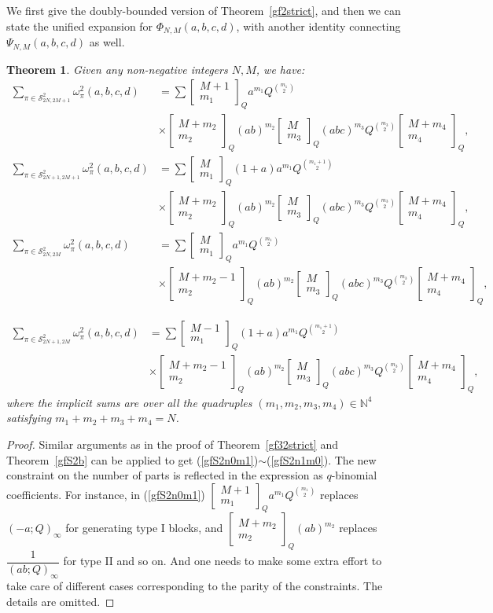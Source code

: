 \documentclass[12pt]{amsart}
\numberwithin{equation}{section}
\theoremstyle{plain}
\newtheorem{theorem}{Theorem}[section]
\theoremstyle{definition}
\newcommand{\N}{\mathbb{N}}
\newcommand\qbin[3]{\left[\begin{matrix} #1 \\ #2 \end{matrix} \right]_{#3}}
\begin{document}
We first give the doubly-bounded version of Theorem~\ref{gf2strict}, and then we can state the unified expansion for $\Phi_{N,M}(a,b,c,d)$, with another identity connecting $\Psi_{N,M}(a,b,c,d)$ as well.
\begin{theorem}\label{bound-s2}
Given any non-negative integers $N,M$, we have:
\begin{align}
\label{gfS2n0m1}
\sum_{\pi\in\mathcal{S}^2_{2N,2M+1}}\omega^2_{\pi}(a,b,c,d) &= \sum\qbin{M+1}{m_1}{Q}a^{m_1}Q^{\binom{m_1}{2}}\\
\nonumber &\times\qbin{M+m_2}{m_2}{Q}(ab)^{m_2} \qbin{M}{m_3}{Q}(abc)^{m_3}Q^{\binom{m_3}{2}}\qbin{M+m_4}{m_4}{Q},\\
\label{gfS2n1m1}
\sum_{\pi\in\mathcal{S}^2_{2N+1,2M+1}}\omega^2_{\pi}(a,b,c,d) &= \sum
\qbin{M}{m_1}{Q}(1+a)a^{m_1}Q^{\binom{m_1+1}{2}}\\
\nonumber &\times\qbin{M+m_2}{m_2}{Q}(ab)^{m_2} \qbin{M}{m_3}{Q}(abc)^{m_3}Q^{\binom{m_3}{2}}\qbin{M+m_4}{m_4}{Q},\\
\label{gfS2n0m0} 
\sum_{\pi\in\mathcal{S}^2_{2N,2M}}\omega^2_{\pi}(a,b,c,d) &= \sum\qbin{M}{m_1}{Q}a^{m_1}Q^{\binom{m_1}{2}}\\
\nonumber &\times\qbin{M+m_2-1}{m_2}{Q}(ab)^{m_2}\qbin{M}{m_3}{Q}(abc)^{m_3}Q^{\binom{m_3}{2}}\qbin{M+m_4}{m_4}{Q},
\end{align}

\begin{align}
\label{gfS2n1m0} 
\sum_{\pi\in\mathcal{S}^2_{2N+1,2M}}\omega^2_{\pi}(a,b,c,d) &= \sum
\qbin{M-1}{m_1}{Q}(1+a)a^{m_1}Q^{\binom{m_1+1}{2}}\\
\nonumber &\times\qbin{M+m_2-1}{m_2}{Q}(ab)^{m_2}\qbin{M}{m_3}{Q}(abc)^{m_3}Q^{\binom{m_3}{2}}\qbin{M+m_4}{m_4}{Q},
\end{align}
where the implicit sums are over all the quadruples $(m_1,m_2,m_3,m_4)\in \N^4$ satisfying
$m_1+m_2+m_3+m_4 = N$.
\end{theorem}

\begin{proof}
Similar arguments as in the proof of Theorem~\ref{gf32strict} and Theorem~\ref{gfS2b} can be applied to get (\ref{gfS2n0m1})$\sim$(\ref{gfS2n1m0}). The new constraint on the number of parts is reflected in the expression as $q$-binomial coefficients. For instance, in (\ref{gfS2n0m1}) $\qbin{M+1}{m_1}{Q}a^{m_1}Q^{\binom{m_1}{2}}$ replaces $(-a;Q)_{\infty}$ for generating type I blocks, and $\qbin{M+m_2}{m_2}{Q}(ab)^{m_2}$ replaces $\dfrac{1}{(ab;Q)_{\infty}}$ for type II and so on.  And one needs to make some extra effort to take care of different cases corresponding to the parity of the constraints. The details are omitted.
\end{proof}
\end{document}

